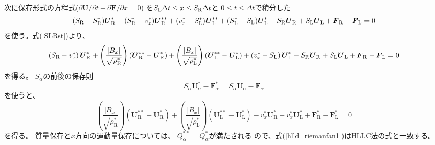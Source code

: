 次に保存形式の方程式($\partial \bm{ U}/\partial t + 
\partial \bm{ F}/\partial x=0$)
を$S_\mathrm{L}\Delta t\le x\le S_\mathrm{R}\Delta t$と
$0\le t\le \Delta t$で積分した
\begin{equation}
(S_\mathrm{R}-S^*_\mathrm{R}){\mbox{\boldmath $ U$}}^*_\mathrm{R}
+ (S^*_\mathrm{R}-v^*_x){\mbox{\boldmath $ U$}}^{**}_\mathrm{R}
+ (v^*_x - S^*_\mathrm{L}){\mbox{\boldmath $ U$}}^{**}_\mathrm{L}
+ (S^*_\mathrm{L}- S_\mathrm{L}){\mbox{\boldmath $ U$}}^{*}_\mathrm{L}
- S_\mathrm{R} {\mbox{\boldmath $ U$}}_\mathrm{R}
+  S_\mathrm{L} {\mbox{\boldmath $ U$}}_\mathrm{L}
+  {\mbox{\boldmath $ F$}}_\mathrm{R}
-  {\mbox{\boldmath $ F$}}_\mathrm{L}
=0
\end{equation}
を使う。式(\ref{SLRst})より、
\begin{equation}
\left(S_\mathrm{R}-v^*_x 
\right){\mbox{\boldmath $ U$}}^*_\mathrm{R}
+ 
\left(\frac{|B_x|}{\sqrt{\rho^*_\mathrm{R}}}\right)
\left( {\mbox{\boldmath $ U$}}^{**}_\mathrm{R} - {\mbox{\boldmath $ U$}}^*_\mathrm{R}\right)
+ \left(\frac{|B_x|}{\sqrt{\rho^*_\mathrm{L}}}
\right)\left( {\mbox{\boldmath $ U$}}^{**}_\mathrm{L}-{\mbox{\boldmath $ U$}}^{*}_\mathrm{L}\right)
+ \left(
v^*_x   - S_\mathrm{L}\right){\mbox{\boldmath $ U$}}^{*}_\mathrm{L}
- S_\mathrm{R} {\mbox{\boldmath $ U$}}_\mathrm{R}
+  S_\mathrm{L} {\mbox{\boldmath $ U$}}_\mathrm{L}
+  {\mbox{\boldmath $ F$}}_\mathrm{R}
-  {\mbox{\boldmath $ F$}}_\mathrm{L}
=0
\label{hlld_riemanfan}
\end{equation}
を得る。
$S_\alpha$の前後の保存則
\begin{equation}
 S_\alpha \bm{ U}^*_{\alpha}  - \bm{ F}^*_\alpha
 = S_\alpha \bm{ U}_{\alpha}  - \bm{ F}_\alpha
\end{equation}
を使うと、
\begin{equation}
\left(\frac{|B_x|}{\sqrt{\rho^*_\mathrm{R}}}\right)
\left( \bm{ U}^{**}_\mathrm{R} - \bm{ U}^*_\mathrm{R}\right)
+ \left(\frac{|B_x|}{\sqrt{\rho^*_\mathrm{L}}}
\right)\left( \bm{ U}^{**}_\mathrm{L}-\bm{ U}^{*}_\mathrm{L}\right)
-v^*_x 
\bm{ U}^*_\mathrm{R}
+  v^*_x\bm{ U}^{*}_\mathrm{L}
+  \bm{ F}^*_\mathrm{R}
-  \bm{ F}^*_\mathrm{L}
=0
\label{hlld_riemanfan1}
\end{equation}
を得る。
質量保存と$x$方向の運動量保存については、
$Q^{**}_\alpha=Q^*_\alpha$が満たされる
ので、式(\ref{hlld_riemanfan1})はHLLC法の式と一致する。

